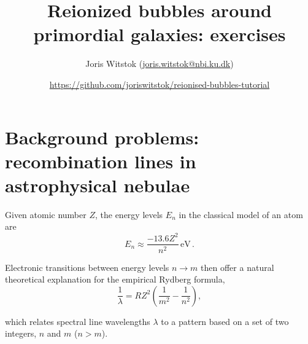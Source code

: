 \documentclass{article}
\title{Reionized bubbles around primordial galaxies: exercises}
\author{Joris Witstok (\href{mailto:joris.witstok@nbi.ku.dk}{joris.witstok@nbi.ku.dk})}
\date{\url{https://github.com/joriswitstok/reionised-bubbles-tutorial}}
\theoremstyle{definition}
\begin{document}
\maketitle

\section{Background problems: recombination lines in astrophysical nebulae}

Given atomic number $Z$, the energy levels $E_n$ in the classical \citet{1913PMag...26....1B} model of an atom are
\begin{equation}
    \label{eq:Atomic_energy_levels}
    E_n \approx \frac{-13.6 Z^2}{n^2} \, \mathrm{eV} \, .
\end{equation}

\noindent Electronic transitions between energy levels $n \rightarrow m$ then offer a natural theoretical explanation for the empirical Rydberg formula,
\begin{equation}
    \label{eq:Rydberg_formula}
    \frac{1}{\lambda} = R Z^2 \left( \frac{1}{m^2} - \frac{1}{n^2} \right) ,
\end{equation}

\noindent which relates spectral line wavelengths $\lambda$ to a pattern based on a set of two integers, $n$ and $m$ ($n > m$).
\end{document}
